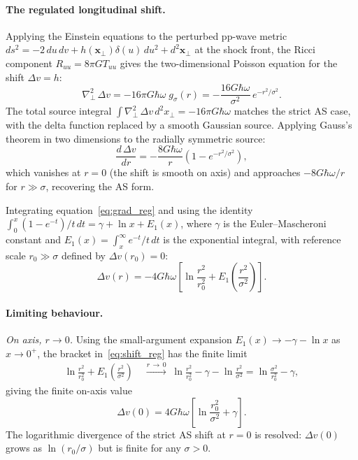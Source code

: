 \paragraph{The regulated longitudinal shift.}
Applying the Einstein equations to the perturbed pp-wave metric 
$ds^2 = -2\,du\,dv + h(\mathbf{x}_\perp)\delta(u)\,du^2 
+ d^2\mathbf{x}_\perp$ at the shock front, the Ricci component 
$R_{uu} = 8\pi G T_{uu}$ gives the two-dimensional Poisson 
equation for the shift $\Delta v = h$:
%
\begin{equation}
    \nabla^2_\perp\,\Delta v 
    = -16\pi G\hbar\omega\; g_\sigma(r)
    = -\frac{16G\hbar\omega}{\sigma^2}\,e^{-r^2/\sigma^2}.
    \label{eq:poisson_reg}
\end{equation}
%
The total source integral 
$\int \nabla^2_\perp\,\Delta v\,d^2x_\perp = -16\pi G\hbar\omega$ 
matches the strict AS case, with the delta function replaced by 
a smooth Gaussian source. Applying Gauss's theorem in two 
dimensions to the radially symmetric source:
%
\begin{equation}
    \frac{d\,\Delta v}{dr} 
    = -\frac{8G\hbar\omega}{r}
      \left(1 - e^{-r^2/\sigma^2}\right),
    \label{eq:grad_reg}
\end{equation}
%
which vanishes at $r = 0$ (the shift is smooth on axis) and 
approaches $-8G\hbar\omega/r$ for $r \gg \sigma$, recovering 
the AS form. 

Integrating equation~\eqref{eq:grad_reg} and using the 
identity 
$\int_0^x (1 - e^{-t})/t\,dt = \gamma + \ln x + E_1(x)$,
where $\gamma$ is the Euler--Mascheroni constant 
and $E_1(x) = \int_x^\infty e^{-t}/t\,dt$ is the exponential 
integral, with reference scale $r_0 \gg \sigma$ 
defined by $\Delta v(r_0) = 0$:
%
\begin{equation}
    \boxed{
    \Delta v(r) 
    = -4G\hbar\omega\!\left[\ln\frac{r^2}{r_0^2} 
      + E_1\!\!\left(\frac{r^2}{\sigma^2}\right)\right].
    }
    \label{eq:shift_reg}
\end{equation}

\paragraph{Limiting behaviour.}

\noindent\textit{On axis, $r \to 0$.}\;
Using the small-argument expansion 
$E_1(x) \to -\gamma - \ln x$ as $x\to 0^+$, the bracket 
in~\eqref{eq:shift_reg} has the finite limit
%
\begin{align}
    \ln\frac{r^2}{r_0^2} + E_1\!\!\left(\frac{r^2}{\sigma^2}\right)
    &\;\xrightarrow{r\,\to\,0}\;
    \ln\frac{r^2}{r_0^2} - \gamma - \ln\frac{r^2}{\sigma^2}
    = \ln\frac{\sigma^2}{r_0^2} - \gamma,
    \label{eq:bracket_limit}
\end{align}
%
giving the finite on-axis value
%
\begin{equation}
    \Delta v(0) 
    = 4G\hbar\omega
    \!\left[\ln\frac{r_0^2}{\sigma^2} + \gamma\right].
    \label{eq:shift_center}
\end{equation}
%
The logarithmic divergence of the strict AS shift at $r = 0$ is 
resolved: $\Delta v(0)$ grows as $\ln(r_0/\sigma)$ but is finite 
for any $\sigma > 0$.

